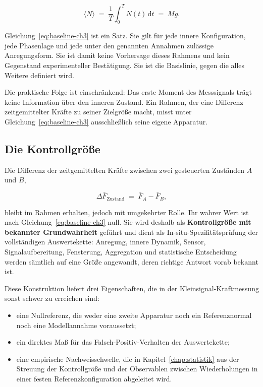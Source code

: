 \documentclass[12pt,a4paper]{report}
\begin{document}
\begin{equation}
  \langle N \rangle
  \;=\; \frac{1}{T}\int_{0}^{T} N(t)\,\mathrm{d}t
  \;=\; M g .
  \label{eq:baseline-ch3}
\end{equation}

Gleichung~\eqref{eq:baseline-ch3} ist ein Satz. Sie gilt für jede innere
Konfiguration, jede Phasenlage und jede unter den genannten Annahmen
zulässige Anregungsform. Sie ist damit keine Vorhersage dieses Rahmens
und kein Gegenstand experimenteller Bestätigung. Sie ist die Basislinie,
gegen die alles Weitere definiert wird.

Die praktische Folge ist einschränkend: Das erste Moment des Messsignals
trägt keine Information über den inneren Zustand. Ein Rahmen, der eine
Differenz zeitgemittelter Kräfte zu seiner Zielgröße macht, misst unter
Gleichung~\eqref{eq:baseline-ch3} ausschließlich seine eigene Apparatur.

\subsection{Die Kontrollgröße}

Die Differenz der zeitgemittelten Kräfte zwischen zwei gesteuerten
Zuständen $A$ und $B$,

\begin{equation}
  \Delta \bar{F}_{\mathrm{Zustand}} \;=\; \bar{F}_{A} - \bar{F}_{B},
  \label{eq:control-ch3}
\end{equation}

bleibt im Rahmen erhalten, jedoch mit umgekehrter Rolle. Ihr wahrer Wert
ist nach Gleichung~\eqref{eq:baseline-ch3} null. Sie wird deshalb als
\textbf{Kontrollgröße mit bekannter Grundwahrheit} geführt und dient als
In-situ-Spezifitätsprüfung der vollständigen Auswertekette: Anregung,
innere Dynamik, Sensor, Signalaufbereitung, Fensterung, Aggregation und
statistische Entscheidung werden sämtlich auf eine Größe angewandt,
deren richtige Antwort vorab bekannt ist.

Diese Konstruktion liefert drei Eigenschaften, die in der
Kleinsignal-Kraftmessung sonst schwer zu erreichen sind:

\begin{itemize}
  \item eine Nullreferenz, die weder eine zweite Apparatur noch ein
        Referenznormal noch eine Modellannahme voraussetzt;
  \item ein direktes Maß für das Falsch-Positiv-Verhalten der
        Auswertekette;
  \item eine empirische Nachweisschwelle, die in Kapitel~\ref{chap:statistik} aus der
        Streuung der Kontrollgröße und der Observablen zwischen
        Wiederholungen in einer festen Referenzkonfiguration abgeleitet
        wird.
\end{itemize}
\end{document}
